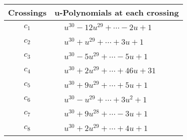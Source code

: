 \documentclass[1p]{elsarticle_modified}
\theoremstyle{definition}
\begin{document}
\begin{tabular}{m{50pt}|m{274pt}}
Crossings & \hspace{64pt}u-Polynomials at each crossing \\
\hline $$\begin{aligned}c_{1}\end{aligned}$$&$\begin{aligned}
&u^{30}-12 u^{29}+\cdots-2 u+1
\end{aligned}$\\
\hline $$\begin{aligned}c_{2}\end{aligned}$$&$\begin{aligned}
&u^{30}+u^{29}+\cdots+3 u+1
\end{aligned}$\\
\hline $$\begin{aligned}c_{3}\end{aligned}$$&$\begin{aligned}
&u^{30}-5 u^{29}+\cdots-5 u+1
\end{aligned}$\\
\hline $$\begin{aligned}c_{4}\end{aligned}$$&$\begin{aligned}
&u^{30}+2 u^{29}+\cdots+46 u+31
\end{aligned}$\\
\hline $$\begin{aligned}c_{5}\end{aligned}$$&$\begin{aligned}
&u^{30}+9 u^{29}+\cdots+5 u+1
\end{aligned}$\\
\hline $$\begin{aligned}c_{6}\end{aligned}$$&$\begin{aligned}
&u^{30}- u^{29}+\cdots+3 u^2+1
\end{aligned}$\\
\hline $$\begin{aligned}c_{7}\end{aligned}$$&$\begin{aligned}
&u^{30}+9 u^{28}+\cdots-3 u+1
\end{aligned}$\\
\hline $$\begin{aligned}c_{8}\end{aligned}$$&$\begin{aligned}
&u^{30}+2 u^{29}+\cdots+4 u+1
\end{aligned}$\\

\end{tabular}
\end{document}

